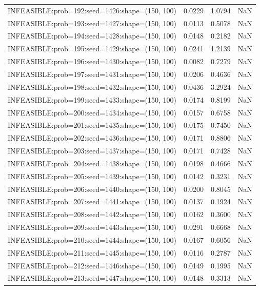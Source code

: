 \begin{longtable}{lccc}
INFEASIBLE:prob=192:seed=1426:shape=(150, 100) &   0.0229 &  1.0794 &    NaN \\
INFEASIBLE:prob=193:seed=1427:shape=(150, 100) &   0.0113 &  0.5078 &    NaN \\
INFEASIBLE:prob=194:seed=1428:shape=(150, 100) &   0.0148 &  0.2182 &    NaN \\
INFEASIBLE:prob=195:seed=1429:shape=(150, 100) &   0.0241 &  1.2139 &    NaN \\
INFEASIBLE:prob=196:seed=1430:shape=(150, 100) &   0.0082 &  0.7279 &    NaN \\
INFEASIBLE:prob=197:seed=1431:shape=(150, 100) &   0.0206 &  0.4636 &    NaN \\
INFEASIBLE:prob=198:seed=1432:shape=(150, 100) &   0.0436 &  3.2924 &    NaN \\
INFEASIBLE:prob=199:seed=1433:shape=(150, 100) &   0.0174 &  0.8199 &    NaN \\
INFEASIBLE:prob=200:seed=1434:shape=(150, 100) &   0.0157 &  0.6758 &    NaN \\
INFEASIBLE:prob=201:seed=1435:shape=(150, 100) &   0.0175 &  0.7450 &    NaN \\
INFEASIBLE:prob=202:seed=1436:shape=(150, 100) &   0.0171 &  0.8806 &    NaN \\
INFEASIBLE:prob=203:seed=1437:shape=(150, 100) &   0.0171 &  0.7428 &    NaN \\
INFEASIBLE:prob=204:seed=1438:shape=(150, 100) &   0.0198 &  0.4666 &    NaN \\
INFEASIBLE:prob=205:seed=1439:shape=(150, 100) &   0.0142 &  0.3231 &    NaN \\
INFEASIBLE:prob=206:seed=1440:shape=(150, 100) &   0.0200 &  0.8045 &    NaN \\
INFEASIBLE:prob=207:seed=1441:shape=(150, 100) &   0.0137 &  0.1924 &    NaN \\
INFEASIBLE:prob=208:seed=1442:shape=(150, 100) &   0.0162 &  0.3600 &    NaN \\
INFEASIBLE:prob=209:seed=1443:shape=(150, 100) &   0.0291 &  0.6668 &    NaN \\
INFEASIBLE:prob=210:seed=1444:shape=(150, 100) &   0.0167 &  0.6056 &    NaN \\
INFEASIBLE:prob=211:seed=1445:shape=(150, 100) &   0.0116 &  0.2787 &    NaN \\
INFEASIBLE:prob=212:seed=1446:shape=(150, 100) &   0.0149 &  0.1995 &    NaN \\
INFEASIBLE:prob=213:seed=1447:shape=(150, 100) &   0.0148 &  0.3313 &    NaN \\

\end{longtable}

